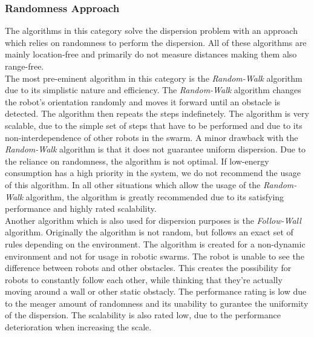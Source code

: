 \subsubsection{Randomness Approach}
The algorithms in this category solve the dispersion problem with an approach which relies on randomness to perform the dispersion.
All of these algorithms are mainly location-free and primarily do not measure distances making them also range-free.\\
The most pre-eminent algorithm in this category is the \emph{Random-Walk} algorithm due to its simplistic nature and efficiency.\cite{morlok2007dispersing}
The \emph{Random-Walk} algorithm changes the robot's orientation randomly and moves it forward until an obstacle is detected. The algorithm then repeats the steps indefinetely.
The algorithm is very scalable, due to the simple set of steps that have to be performed and due to its non-interdependence of other robots in the swarm.
A minor drawback with the \emph{Random-Walk} algorithm is that it does not guarantee uniform dispersion.
Due to the reliance on randomness, the algorithm is not optimal. If low-energy consumption has a high priority in the system, we do not recommend the usage of this algorithm.
In all other situations which allow the usage of the \emph{Random-Walk} algorithm, the algorithm is greatly recommended due to its satisfying performance and highly rated scalability.\\
Another algorithm which is also used for dispersion purposes is the \emph{Follow-Wall} algorithm.\cite{morlok2007dispersing}
Originally the algorithm is not random, but follows an exact set of rules depending on the environment. 
The algorithm is created for a non-dynamic environment and not for usage in robotic swarms.
The robot is unable to see the difference between robots and other obstacles. This creates the possibility for robots to constantly follow each other, while thinking that they're actually moving around a wall or other static obstacly.
The performance rating is low due to the meager amount of randomness and its unability to gurantee the uniformity of the dispersion. The scalability is also rated low, due to the performance deterioration when increasing the scale.
